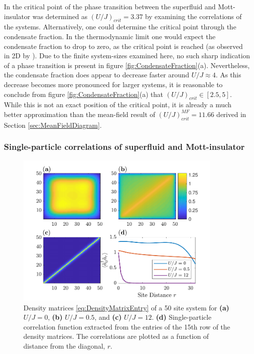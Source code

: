 In \cite{Kuhner2000} the critical point of the phase transition between the superfluid and Mott-insulator was determined as $\left( {U}/{J} \right)_{crit} = 3.37$ by examining the correlations of the systems. Alternatively, one could determine the critical point through the condensate fraction. In the thermodynamic limit one would expect the condensate fraction to drop to zero, as the critical point is reached (as observed in 2D by \cite{Spielman2008}).
Due to the finite system-sizes examined here, no such sharp indication of a phase transition is present in figure \ref{fig:CondensateFraction}(a). Nevertheless, the condensate fraction does appear to decrease faster around $U/J \approx 4$. As this decrease becomes more pronounced for larger systems, it is reasonable to conclude from figure \ref{fig:CondensateFraction}(a) that $\left( {U}/{J} \right)_{crit} \in [ 2.5 , 5 ]$. While this is not an exact position of the critical point, it is already a much better approximation than the mean-field result of $\left( U/J \right)_{crit}^{MF} = 11.66$ derived in Section \ref{sec:MeanFieldDiagram}.


\subsubsection{Single-particle correlations of superfluid and Mott-insulator}

\begin{figure}[h!]
    \centering
    \includegraphics[width=0.9\textwidth]{Figures/DensityMatrices.pdf}
    \caption{Density matrices \eqref{eq:DensityMatrixEntry} of a 50 site system for \textbf{(a)} $U/J = 0$, \textbf{(b)} $U/J = 0.5$, and \textbf{(c)} $U/J = 12$. \textbf{(d)} Single-particle correlation function extracted from the entries of the 15th row of the density matrices. The correlations are plotted as a function of distance from the diagonal, $r$. }
    \label{fig:DensityMatrices}
\end{figure}

